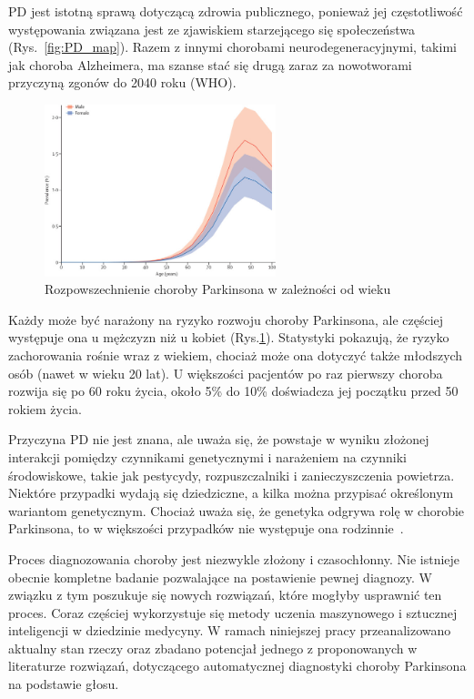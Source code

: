 PD jest istotną sprawą dotyczącą zdrowia publicznego, ponieważ jej częstotliwość występowania związana jest ze zjawiskiem starzejącego się społeczeństwa (Rys.~\ref{fig:PD_map}).
Razem z innymi chorobami neurodegeneracyjnymi, takimi jak choroba Alzheimera, ma szanse stać się drugą zaraz za nowotworami przyczyną zgonów do 2040 roku (WHO).

\begin{figure}[htbp]
	\centering
	\includegraphics[width=0.6\textwidth]{./img/PD_prevalence}
	\caption{Rozpowszechnienie choroby Parkinsona w zależności od wieku \cite {global_PD}}
    \label{fig:PD_prevalance}
\end{figure}

Każdy może być narażony na ryzyko rozwoju choroby Parkinsona, ale częściej występuje ona u mężczyzn niż u kobiet (Rys.\ref{fig:PD_prevalance}).
Statystyki pokazują, że ryzyko zachorowania rośnie wraz z wiekiem, chociaż może ona dotyczyć także młodszych osób (nawet w wieku 20 lat).
U większości pacjentów po raz pierwszy choroba rozwija się po 60 roku życia, około 5\% do 10\% doświadcza jej początku przed 50 rokiem życia.

Przyczyna PD nie jest znana, ale uważa się, że powstaje w wyniku złożonej interakcji pomiędzy czynnikami genetycznymi i
narażeniem na czynniki środowiskowe, takie jak pestycydy, rozpuszczalniki i zanieczyszczenia powietrza.
Niektóre przypadki wydają się dziedziczne, a kilka można przypisać określonym wariantom genetycznym.
Chociaż uważa się, że genetyka odgrywa rolę w chorobie Parkinsona, to w większości przypadków nie występuje ona  rodzinnie~\cite{National_Institute_on_Aging_2022}.

Proces diagnozowania choroby jest niezwykle złożony i czasochłonny.
Nie istnieje obecnie kompletne badanie pozwalające na postawienie pewnej diagnozy.
W związku z tym poszukuje się nowych rozwiązań, które mogłyby usprawnić ten proces.
Coraz częściej wykorzystuje się metody uczenia maszynowego i sztucznej inteligencji w dziedzinie medycyny.
W ramach niniejszej pracy przeanalizowano aktualny stan rzeczy oraz zbadano potencjał jednego z proponowanych w literaturze rozwiązań, dotyczącego automatycznej diagnostyki
choroby Parkinsona na podstawie głosu.

